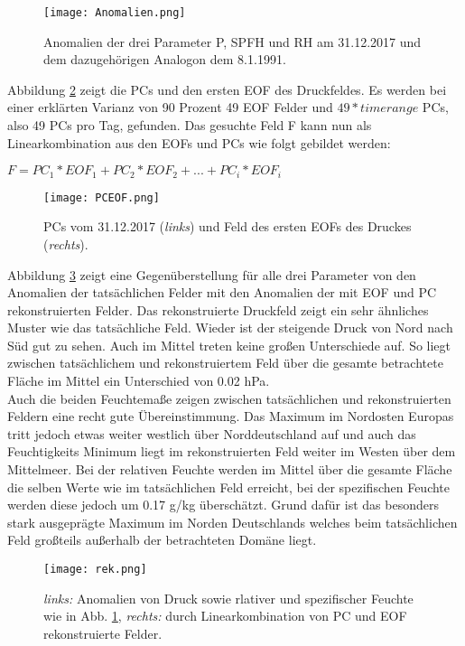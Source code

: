 \documentclass[12pt]{article}
\begin{document}
\begin{figure} [!h]
\centering
\texttt{[image: Anomalien.png]} %
\caption{Anomalien der drei Parameter P, SPFH und RH am 31.12.2017 und dem dazugehörigen Analogon dem 8.1.1991.}
\label{Abb2}
\end{figure}

Abbildung \ref{Abb3} zeigt die PCs und den ersten EOF des Druckfeldes. Es werden bei einer erklärten Varianz von 90 Prozent 49 EOF Felder und $49 * time range$ PCs, also 49 PCs pro Tag, gefunden. Das gesuchte Feld F kann nun als Linearkombination aus den EOFs und PCs wie folgt gebildet werden:

\hspace{2cm} $ F=PC_1*EOF_1+PC_2*EOF_2+...+PC_i*EOF_i$

\begin{figure} [!h]
\centering
\texttt{[image: PCEOF.png]} %
\caption{PCs vom 31.12.2017 (\textit{links}) und Feld des ersten EOFs des Druckes (\textit{rechts}).}
\label{Abb3}
\end{figure}

Abbildung \ref{Abb4} zeigt eine Gegenüberstellung für alle drei Parameter von den Anomalien der tatsächlichen Felder mit den Anomalien der mit EOF und PC rekonstruierten Felder. Das rekonstruierte Druckfeld zeigt ein sehr ähnliches Muster wie das tatsächliche Feld. Wieder ist der steigende Druck von Nord nach Süd gut zu sehen. Auch im Mittel treten keine großen Unterschiede auf. So liegt zwischen tatsächlichem und rekonstruiertem Feld über die gesamte betrachtete Fläche im Mittel ein Unterschied von 0.02 hPa.\\
Auch die beiden Feuchtemaße zeigen zwischen tatsächlichen und rekonstruierten Feldern eine recht gute Übereinstimmung. Das Maximum im Nordosten Europas tritt jedoch etwas weiter westlich über Norddeutschland auf und auch das Feuchtigkeits Minimum liegt im rekonstruierten Feld weiter im Westen über dem Mittelmeer. Bei der relativen Feuchte werden im Mittel über die gesamte Fläche die selben Werte wie im tatsächlichen Feld erreicht, bei der spezifischen Feuchte werden diese jedoch um 0.17 g/kg überschätzt. Grund dafür ist das besonders stark ausgeprägte Maximum im Norden Deutschlands welches beim tatsächlichen Feld großteils außerhalb der betrachteten Domäne liegt.

\begin{figure} [!h]
\centering
\texttt{[image: rek.png]} %
\caption{\textit{links:} Anomalien von Druck sowie rlativer und spezifischer Feuchte wie in Abb. \ref{Abb2}, \textit{rechts:} durch Linearkombination von PC und EOF rekonstruierte Felder.}
\label{Abb4}
\end{figure}
\end{document}
